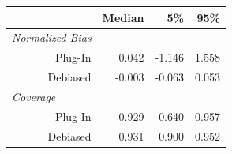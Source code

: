 \begin{tabular}{r|rrr}
\toprule
  & Median & 5\% & 95\%\\
\midrule
\multicolumn{1}{l|}{\textit{Normalized Bias}}\\
Plug-In & 0.042 & -1.146 & 1.558\\
Debiased & -0.003 & -0.063 & 0.053\\
\midrule
\multicolumn{1}{l|}{\textit{Coverage}}\\
Plug-In & 0.929 & 0.640 & 0.957\\
Debiased & 0.931 & 0.900 & 0.952\\
\bottomrule
\end{tabular}

